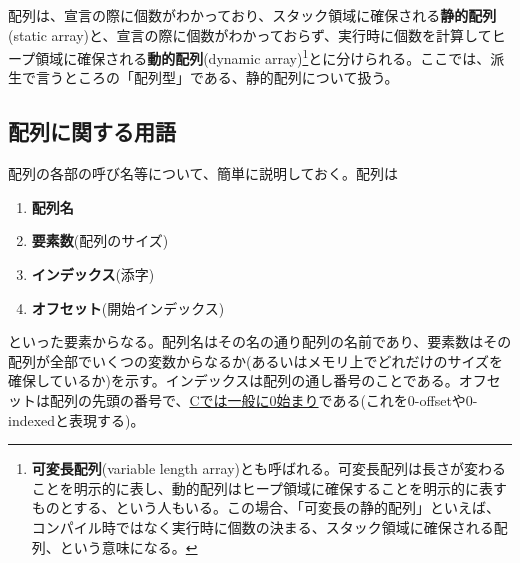 配列は、宣言の際に個数がわかっており、スタック領域に確保される\textbf{静的配列}(static array)と、宣言の際に個数がわかっておらず、実行時に個数を計算してヒープ領域に確保される\textbf{動的配列}(dynamic array)\footnote{\textbf{可変長配列}(variable length array)とも呼ばれる。可変長配列は長さが変わることを明示的に表し、動的配列はヒープ領域に確保することを明示的に表すものとする、という人もいる。この場合、「可変長の静的配列」といえば、コンパイル時ではなく実行時に個数の決まる、スタック領域に確保される配列、という意味になる。}とに分けられる。ここでは、派生で言うところの「配列型」である、静的配列について扱う。
\subsection{配列に関する用語}
配列の各部の呼び名等について、簡単に説明しておく。配列は
\begin{enumerate}
\item \textbf{配列名}
\item \textbf{要素数}(配列のサイズ)
\item \textbf{インデックス}(添字)
\item \textbf{オフセット}(開始インデックス)
\end{enumerate}
といった要素からなる。配列名はその名の通り配列の名前であり、要素数はその配列が全部でいくつの変数からなるか(あるいはメモリ上でどれだけのサイズを確保しているか)を示す。インデックスは配列の通し番号のことである。オフセットは配列の先頭の番号で、\underline{Cでは一般に0始まり}である(これを0-offsetや0-indexedと表現する)。


